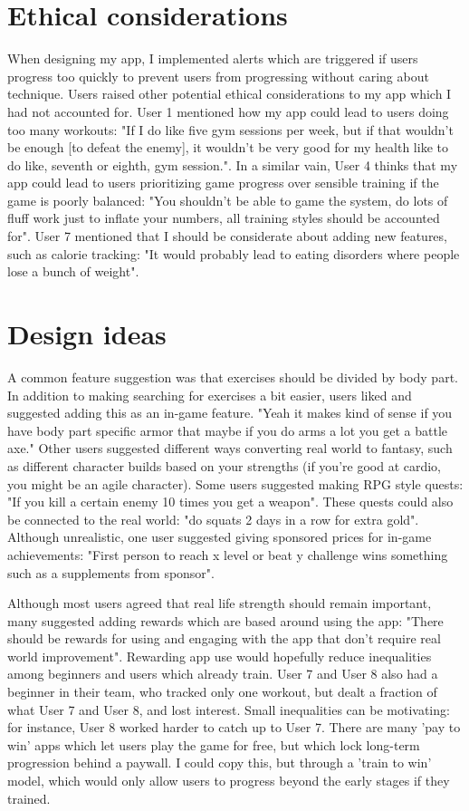 \documentclass{l4proj}
\begin{document}
\section{Ethical considerations}
When designing my app, I implemented alerts which are triggered if users progress too quickly to prevent users from progressing without caring about technique. Users raised other potential ethical considerations to my app which I had not accounted for. User 1 mentioned how my app could lead to users doing too many workouts: "If I do like five gym sessions per week, but if that wouldn't be enough [to defeat the enemy], it wouldn't be very good for my health like to do like, seventh or eighth, gym session.". In a similar vain, User 4 thinks that my app could lead to users prioritizing game progress over sensible training if the game is poorly balanced: "You shouldn't be able to game the system, do lots of fluff work just to inflate your numbers, all training styles should be accounted for". User 7 mentioned that I should be considerate about adding new features, such as calorie tracking: "It would probably lead to eating disorders where people lose a bunch of weight".




\section{Design ideas}
A common feature suggestion was that exercises should be divided by body part. In addition to making searching for exercises a bit easier, users liked and suggested adding this as an in-game feature. "Yeah it makes kind of sense if you have body part specific armor that maybe if you do arms a lot you get a battle axe." Other users suggested different ways converting real world to fantasy, such as different character builds based on your strengths (if you're good at cardio, you might be an agile character). Some users suggested making RPG style quests: "If you kill a certain enemy 10 times you get a weapon". These quests could also be connected to the real world: "do squats 2 days in a row for extra gold". Although unrealistic, one user suggested giving sponsored prices for in-game achievements: "First person to reach x level or beat y challenge wins something such as a supplements from sponsor".

Although most users agreed that real life strength should remain important, many suggested adding rewards which are based around using the app: "There should be rewards for using and engaging with the app that don't require real world improvement". Rewarding app use would hopefully reduce inequalities among beginners and users which already train.  User 7 and User 8 also had a beginner in their team, who tracked only one workout, but dealt a fraction of what User 7 and User 8, and lost interest. Small inequalities can be motivating: for instance, User 8 worked harder to catch up to User 7. There are many 'pay to win' apps which let users play the game for free, but which lock long-term progression behind a paywall. I could copy this, but through a 'train to win' model, which would only allow users to progress beyond the early stages if they trained. 
\end{document}
